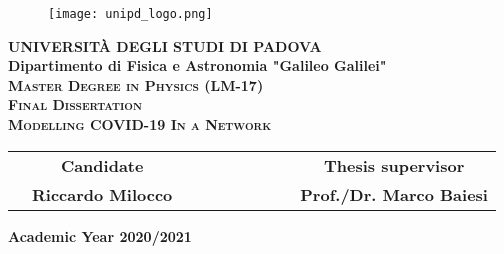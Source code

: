 \documentclass[a4paper,10pt, oneside]{book} %
\theoremstyle{definition}
\begin{document}
\frontmatter


\begin{titlepage}
\vspace{5mm}
\begin{figure}[hbtp]
\centering
\texttt{[image: unipd\_logo.png]}
\end{figure}
\vspace{5mm}
\begin{center}
{{\huge{\textbf{\LARGE UNIVERSIT\`A DEGLI STUDI DI PADOVA}}}\\}
\vspace{20mm}
{\Large{\bf Dipartimento di Fisica e Astronomia "Galileo Galilei"}} \\
\vspace{5mm}
{\Large{\textsc{\bf Master Degree in Physics (LM-17)}}}\\  
\vspace{20mm}
{\Large{\textsc{\bf Final Dissertation}}}\\
\vspace{30mm}
{\Large{\textsc{\bf Modelling COVID-19 In a Network}}}\\
\vspace{45mm}
\end{center}

\begin{spacing}{2}
\begin{tabular}{cccccccccc}
	& {\Large{\bf Candidate}} &&&&&&&& {\Large{\bf Thesis supervisor}}\\
	& {\Large{\bf Riccardo Milocco}} &&&&&&&& {\Large{\bf Prof./Dr. Marco Baiesi}}\\
\end{tabular}
\end{spacing}
\vspace{15 mm}

\begin{center}
{\Large{\bf Academic Year 2020/2021}}
\end{center}
\end{titlepage}

\restoregeometry

\clearpage{\pagestyle{empty}\cleardoublepage}

\pagestyle{empty}

\vspace*{\fill}
\tableofcontents
\vspace*{\fill}

	
\end{document}
